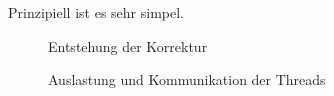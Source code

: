 Prinzipiell ist es sehr simpel.

\begin{figure}[ht]
\centering
    \begin{tikzpicture}[scale=2.2]
        
    \end{tikzpicture}
\caption{Entstehung der Korrektur}
\end{figure}

\begin{figure}[ht]
\centering
    
\caption{Auslastung und Kommunikation der Threads}
\end{figure}